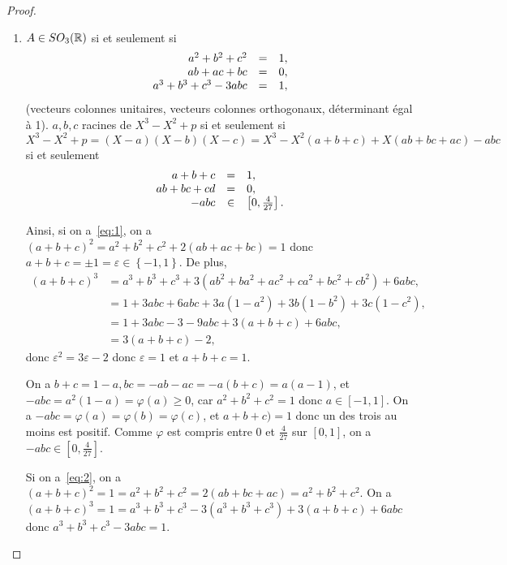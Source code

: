 \documentclass[12pt]{article}
\begin{document}
\begin{proof}
	\phantom{}
	\begin{enumerate}
		\item $A\in SO_{3}(\mathbb{R})$ si et seulement si 
		\begin{equation}
			\label{eq:1}
			\begin{array}[]{rcl}
				a^{2}+b^{2}+c^{2} &=& 1,\\
				ab+ac+bc &=& 0,\\
				a^{3}+b^{3}+c^{3}-3abc &=& 1,
			\end{array}
		\end{equation}
		(vecteurs colonnes unitaires, vecteurs colonnes orthogonaux, déterminant égal à 1).
		$a,b,c$ racines de $X^{3}-X^{2}+p$ si et seulement si $X^{3}-X^{2}+p=(X-a)(X-b)(X-c)=X^{3}-X^{2}(a+b+c)+X(ab+bc+ac)-abc$ si et seulement 
		\begin{equation}
			\label{eq:2}
			\begin{array}[]{rcl}
				a+b+c &=& 1,\\
				ab+bc+cd &=& 0,\\
				-abc&\in&\left[0,\frac{4}{27}\right].
			\end{array}
		\end{equation}

		Ainsi, si on a~\eqref{eq:1}, on a $(a+b+c)^{2}=a^{2}+b^{2}+c^{2}+2(ab+ac+bc)=1$ donc $a+b+c=\pm1=\varepsilon\in\left\lbrace-1,1\right\rbrace$.
		De plus,
		\begin{align}
			(a+b+c)^{3}
			&= a^{3}+b^{3}+c^{3}+3(ab^{2}+ba^{2}+ac^{2}+ca^{2}+bc^{2}+cb^{2})+6abc,\\
			&=1+3abc+6abc+3a(1-a^{2})+3b(1-b^{2})+3c(1-c^{2}),\\
			&=1+3abc-3-9abc+3(a+b+c)+6abc,\\
			&=3(a+b+c)-2,
		\end{align}
		donc $\varepsilon^{2}=3\varepsilon-2$ donc $\varepsilon=1$ et $a+b+c=1$.

		On a $b+c=1-a,bc=-ab-ac=-a(b+c)=a(a-1)$, et $-abc=a^{2}(1-a)=\varphi(a)\geqslant0$, car $a^{2}+b^{2}+c^{2}=1$ donc $a\in[-1,1]$. On a $-abc=\varphi(a)=\varphi(b)=\varphi(c)$, et $a+b+c)=1$ donc un des trois au moins est positif. Comme $\varphi$ est compris entre $0$ et $\frac{4}{27}$ sur $[0,1]$, on a $-abc\in\left[0,\frac{4}{27}\right]$.

		Si on a~\eqref{eq:2}, on a $(a+b+c)^{2}=1=a^{2}+b^{2}+c^{2}=2(ab+bc+ac)=a^{2}+b^{2}+c^{2}$. On a $(a+b+c)^{3}=1=a^{3}+b^{3}+c^{3}-3(a^{3}+b^{3}+c^{3})+3(a+b+c)+6abc$ donc $a^{3}+b^{3}+c^{3}-3abc=1$.


\end{enumerate}
\end{proof}
\end{document}
